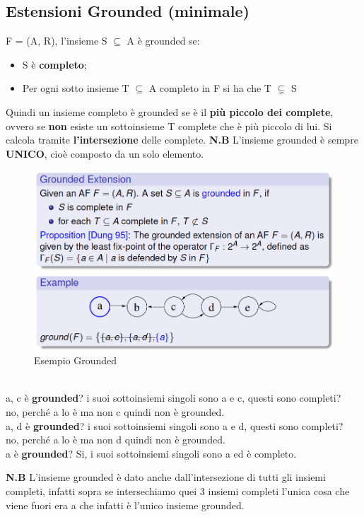 \subsection{Estensioni Grounded (minimale)}
F = (A, R), l'insieme S $\subseteq$ A è grounded se:
\begin{itemize}
    \item S è \textbf{completo};
    \item Per ogni sotto insieme T $\subseteq$ A completo in F si ha che T
          $\subsetneq$ S
\end{itemize}
Quindi un insieme completo è grounded se è il \textbf{più piccolo dei complete},
ovvero se \textbf{non} esiste un sottoinsieme T complete che è più piccolo di
lui. Si calcola tramite \textbf{l'intersezione} delle complete. \textbf{N.B}
L'insieme grounded è sempre \textbf{UNICO}, cioè composto da un solo elemento.
\begin{figure}[htp]
    \centering
    \includegraphics[width=12cm, keepaspectratio]{img/Cap6/grounded.png}
    \caption{Esempio Grounded}
\end{figure}
\\a, c è \textbf{grounded}? i suoi sottoinsiemi singoli sono a e c, questi sono
completi? \\no, perché a lo è ma non c quindi non è grounded. \\a, d è
\textbf{grounded}? i suoi sottoinsiemi singoli sono a e d, questi sono completi?
\\no, perché a lo è ma non d quindi non è grounded. \\a è \textbf{grounded}? Si,
i suoi sottoinsiemi singoli sono a ed è completo.

\vspace{0.8cm}

\textbf{N.B} L'insieme grounded è dato anche dall'intersezione di tutti gli
insiemi completi, infatti sopra se intersechiamo quei 3 insiemi completi l'unica
cosa che viene fuori era a che infatti è l'unico insieme grounded.

